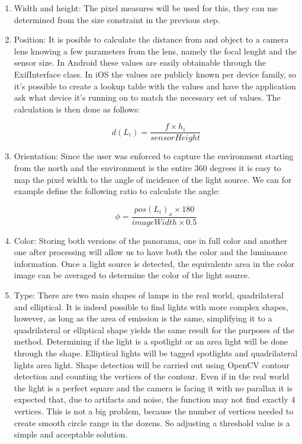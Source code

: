 \begin{enumerate}
\item Width and height: The pixel measures will be used for this, they can me determined from the size constraint in the previous step.
\item Position: It is posible to calculate the distance from and object to a camera lens knowing a few parameters from the lens, namely the focal lenght and the sensor size. In Android these values are easily obtainable through the ExifInterface class. In iOS the values are publicly known per device family, so it's possible to create a lookup table with the values and have the application ask what device it's running on to match the necessary set of values. The calculation is then done as follows:

\begin{equation}
    d(L_i) = \frac{ f \times h_i}{sensorHeight}
\end{equation}

\item  Orientation: Since the user was enforced to capture the environment starting from the north and the environment is the entire 360 degrees it is easy to map the pixel width to the angle of incidence of the light source. We can for example define the following ratio to calculate the angle:

\begin{equation}
    \phi = \frac{pos(L_i)_x \times 180}{imageWidth \times 0.5}
\end{equation}

\item Color: Storing both versions of the panorama, one in full color and another one after processing will allow us to have both the color and the luminance information. Once a light source is detected, the equivalente area in the color image can be averaged to determine the color of the light source.
\item Type: There are two main shapes of lamps in the real world, quadrilateral and elliptical. It is indeed possible to find lights with more complex shapes, however, as long as the area of emission is the same, simplifying it to a quadrilateral or elliptical shape yields the same result for the purposes of the method.
\newline 
Determining if the light is a spotlight or an area light will be done through the shape. Elliptical lights will be tagged spotlights and quadrilateral lights area light. Shape detection will be carried out using OpenCV contour detection and counting the vertices of the contour. Even if in the real world the light is a perfect square and the camera is facing it with no parallax it is expected that,  due to artifacts and noise, the function may not find exactly 4 vertices. This is not a big problem, because the number of vertices needed to create smooth circle range in the dozens. So adjusting a threshold value is a simple and acceptable solution.
\end{enumerate}

